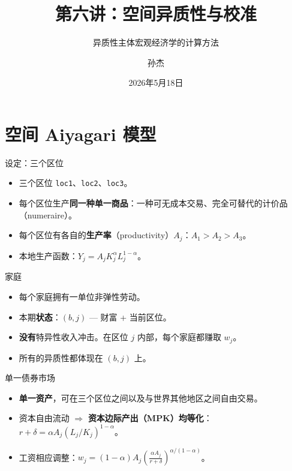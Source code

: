 \documentclass[10pt,aspectratio=169]{beamer}
\title{第六讲：空间异质性与校准}
\subtitle{异质性主体宏观经济学的计算方法}
\author{孙杰}
\institute{多伦多大学}
\date{2026年5月18日}
\begin{document}
\maketitle

\section[空间 Aiyagari 模型]{空间 Aiyagari 模型}

\begin{frame}{设定：三个区位}

\begin{itemize}
  \item 三个区位 \texttt{loc1}、\texttt{loc2}、\texttt{loc3}。
  \item 每个区位生产\textbf{同一种单一商品}：一种可无成本交易、完全可替代的计价品（numeraire）。
  \item 每个区位有各自的\textbf{生产率}（productivity）$A_j$：$A_1 > A_2 > A_3$。
  \item 本地生产函数：$Y_j = A_j K_j^{\alpha} L_j^{1-\alpha}$。
\end{itemize}

\end{frame}

\begin{frame}{家庭}

\begin{itemize}
  \item 每个家庭拥有一单位非弹性劳动。
  \item 本期\textbf{状态}：$(b, j)$ --- 财富 + 当前区位。
  \item \textbf{没有}特异性收入冲击。在区位 $j$ 内部，每个家庭都赚取 $w_j$。
  \item 所有的异质性都体现在 $(b, j)$ 上。
\end{itemize}

\end{frame}

\begin{frame}{单一债券市场}

\begin{itemize}
  \item \textbf{单一资产}，可在三个区位之间以及与世界其他地区之间自由交易。
  \item 资本自由流动 $\Rightarrow$ \textbf{资本边际产出（MPK）均等化}：$r + \delta = \alpha A_j (L_j / K_j)^{1 - \alpha}$。
  \item 工资相应调整：$w_j = (1 - \alpha) A_j \left( \frac{\alpha A_j}{r + \delta} \right)^{\alpha / (1 - \alpha)}$。
\end{itemize}

\end{frame}
\end{document}
